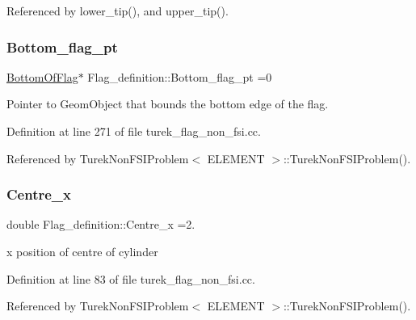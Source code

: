 Referenced by lower\+\_\+tip(), and upper\+\_\+tip().

\mbox{\label{namespaceFlag__definition_adde5e58da47e90ef46e1183188281f2e}} 
\subsubsection{\texorpdfstring{Bottom\+\_\+flag\+\_\+pt}{Bottom\_flag\_pt}}
{\footnotesize\ttfamily \hyperlink{classFlag__definition_1_1BottomOfFlag}{Bottom\+Of\+Flag}$\ast$ Flag\+\_\+definition\+::\+Bottom\+\_\+flag\+\_\+pt =0}



Pointer to Geom\+Object that bounds the bottom edge of the flag. 



Definition at line 271 of file turek\+\_\+flag\+\_\+non\+\_\+fsi.\+cc.



Referenced by Turek\+Non\+F\+S\+I\+Problem$<$ E\+L\+E\+M\+E\+N\+T $>$\+::\+Turek\+Non\+F\+S\+I\+Problem().

\mbox{\label{namespaceFlag__definition_a60f30c718c6c67504b05dca7832be8aa}} 
\subsubsection{\texorpdfstring{Centre\+\_\+x}{Centre\_x}}
{\footnotesize\ttfamily double Flag\+\_\+definition\+::\+Centre\+\_\+x =2.}



x position of centre of cylinder 



Definition at line 83 of file turek\+\_\+flag\+\_\+non\+\_\+fsi.\+cc.



Referenced by Turek\+Non\+F\+S\+I\+Problem$<$ E\+L\+E\+M\+E\+N\+T $>$\+::\+Turek\+Non\+F\+S\+I\+Problem().

\mbox{\label{namespaceFlag__definition_a0024007edc2ad0ef647939aa6b06bde7}} 
